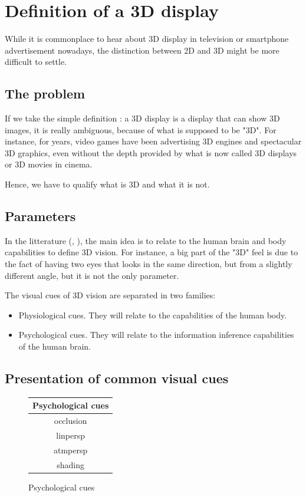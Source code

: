 \section{Definition of a 3D display}
While it is commonplace to hear about 3D display in television or smartphone advertisement nowadays, the distinction between 2D and 3D might be more difficult to settle.
\subsection{The problem}
If we take the simple definition : a 3D display is a display that can show 3D images, it is really ambiguous, because of what is supposed to be "3D". For instance, for years, video games have been advertising 3D engines and spectacular 3D graphics, even without the depth provided by what is now called 3D displays or 3D movies in cinema.

Hence, we have to qualify what is 3D and what it is not.
\subsection{Parameters}
In the litterature (\cite{okoshi1976three}, \cite{pimenta2012comprehensive}), the main idea is to relate to the human brain and body capabilities to define 3D vision. For instance, a big part of the "3D" feel is due to the fact of having two eyes that looks in the same direction, but from a slightly different angle, but it is not the only parameter.

The visual cues of 3D vision are separated in two families:  
\begin{itemize}
\item Physiological cues. They will relate to the capabilities of the human body.
\item Psychological cues. They will relate to the information inference capabilities of the human brain.
\end{itemize}
\subsection{Presentation of common visual cues}

\begin{figure}[h!]
\centering
\begin{tabular}{|c|}
\hline
Psychological cues \\
\hline
\Gls{occlusion} \\
\Gls{linpersp} \\
\Gls{atmpersp} \\
\Gls{shading} \\
\hline
\end{tabular}
\caption{Psychological cues}
\end{figure}

